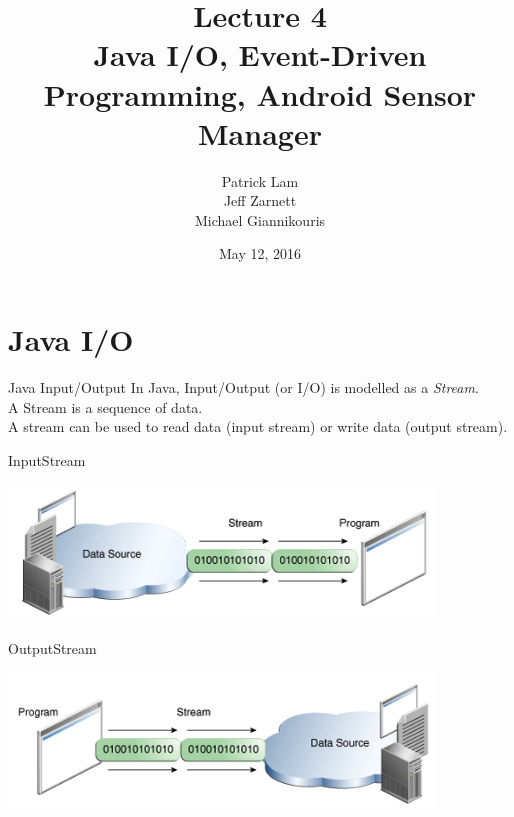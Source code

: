 \documentclass[aspectratio=169]{beamer}
\title{Lecture 4 \\ Java I/O, Event-Driven Programming, Android Sensor Manager}
\date{May 12, 2016}
\author{Patrick Lam \\ Jeff Zarnett \\ Michael Giannikouris}
\institute{Department of Electrical and Computer Engineering}
\begin{document}
\maketitle



\section*{Java I/O}



\begin{frame}{Java Input/Output}
In Java, Input/Output (or I/O) is modelled as a \textit{Stream}. \\
A Stream is a sequence of data. \\
A stream can be used to read data (input stream) or write data (output stream). \\
\end{frame}



\begin{frame}{InputStream}
\begin{center}
\includegraphics[width=0.85\textwidth]{img/inputstream.png}
\end{center}
\end{frame}



\begin{frame}{OutputStream}
\begin{center}
\includegraphics[width=0.85\textwidth]{img/outputstream.png}
\end{center}
\end{frame}
\end{document}
